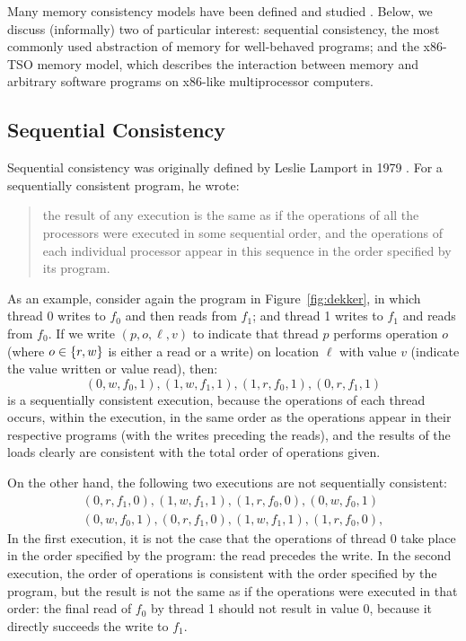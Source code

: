 \documentclass[11pt]{report}         %
\begin{document}
Many memory consistency models have been defined and studied \cite{SteinkeNutt,higham98weak,DBLP:journals/computer/AdveG96}. Below, we discuss (informally) two of particular interest: sequential consistency, the most commonly used abstraction of memory for well-behaved programs; and the x86-TSO memory model, which describes the interaction between memory and arbitrary software programs on x86-like multiprocessor computers. 

\subsection{Sequential Consistency} 
\label{sec:sc}

Sequential consistency was originally defined by Leslie Lamport in 1979 \cite{DBLP:journals/tc/Lamport79}. For a sequentially consistent program, he wrote: \begin{quotation}\noindent the result of any execution is the same as if the operations of all the processors were executed in some sequential order, and the operations of each individual processor appear in this sequence in the order specified by its program. \end{quotation} 

As an example, consider again the program in Figure~\ref{fig:dekker}, in which thread 0 writes to $f_0$ and then reads from $f_1$; and thread 1 writes to $f_1$ and reads from $f_0$. If we write $(p,o,\ell,v)$ to indicate that thread $p$ performs operation $o$ (where $o \in \left\lbrace r,w \right\rbrace$ is either a read or a write) on location $\ell$ with value $v$ (indicate the value written or value read), then: \[ (0,w,f_0,1), (1,w,f_1,1), (1,r,f_0,1), (0,r,f_1,1)\] is a sequentially consistent execution, because the operations of each thread occurs, within the execution, in the same order as the operations appear in their respective programs (with the writes preceding the reads), and the results of the loads clearly are consistent with the total order of operations given. 

On the other hand, the following two executions are not sequentially consistent: \begin{align*}
  (0,r,f_1,0), (1,w,f_1,1), (1,r,f_0,0), (0,w,f_0,1) \\ 
  (0,w,f_0,1), (0,r,f_1,0), (1,w,f_1,1), (1,r,f_0,0), 
\end{align*} In the first execution, it is not the case that the operations of thread 0 take place in the order specified by the program: the read precedes the write. In the second execution, the order of operations is consistent with the order specified by the program, but the result is not the same as if the operations were executed in that order: the final read of $f_0$ by thread 1 should not result in value 0, because it directly succeeds the write to $f_1$. 
\end{document}
